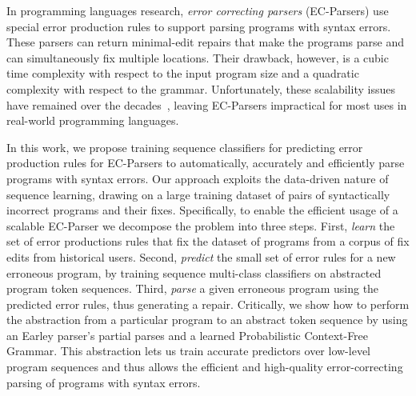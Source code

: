 In programming languages research, \emph{error
correcting parsers} (EC-Parsers) \citep{Aho_1972} use special error production
rules to support parsing programs with syntax errors. These parsers can return
minimal-edit repairs that make the programs parse and can simultaneously fix
multiple locations. Their drawback,
however, is a cubic time complexity with respect to the
input program size and a quadratic complexity with respect to the grammar.
%
Unfortunately, these scalability issues have remained over the
decades~\citep{McLean1996, Rajasekaran2014}, leaving EC-Parsers
impractical for most uses in real-world programming languages.

In this work, we propose training sequence classifiers for predicting
error
production rules for EC-Parsers to automatically, accurately and
efficiently parse programs with syntax errors. Our approach exploits the data-driven
nature of sequence learning, drawing on a large training dataset of pairs
of syntactically incorrect programs and their fixes.
%
Specifically, to enable the efficient usage of a scalable EC-Parser we decompose
the problem into three steps.
%
First, \emph{learn} the set of error productions rules that fix the dataset of
programs from a corpus of fix edits from historical users.
%
Second, \emph{predict} the small set of error rules for a new erroneous program,
by training sequence multi-class classifiers on abstracted program token
sequences.
%
Third, \emph{parse} a given erroneous program using the predicted error rules,
thus generating a repair.
%
Critically, we show how to perform the abstraction from a particular
program to an abstract token sequence by using an Earley parser's
\citep{Earley_1970} partial parses and a learned Probabilistic Context-Free
Grammar. This abstraction lets us train accurate predictors over low-level
program sequences and thus allows the efficient and high-quality
error-correcting parsing of programs with syntax errors.

